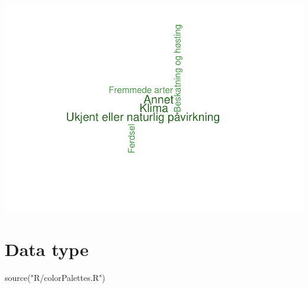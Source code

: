 \documentclass[
]{book}
\newenvironment{Shaded}{\begin{snugshade}}{\end{snugshade}}
\newcommand{\FunctionTok}[1]{\textcolor[rgb]{0.00,0.00,0.00}{#1}}
\newcommand{\NormalTok}[1]{#1}
\newcommand{\StringTok}[1]{\textcolor[rgb]{0.31,0.60,0.02}{#1}}
\begin{document}
\includegraphics{04-other_figures_files/figure-latex/Wordcloud - Lomvi-1.pdf}

\hypertarget{data-type}{%
\section{Data type}\label{data-type}}

\begin{Shaded}
\begin{Highlighting}[]
\FunctionTok{source}\NormalTok{(}\StringTok{"R/colorPalettes.R"}\NormalTok{)}
\end{Highlighting}
\end{Shaded}
\end{document}
